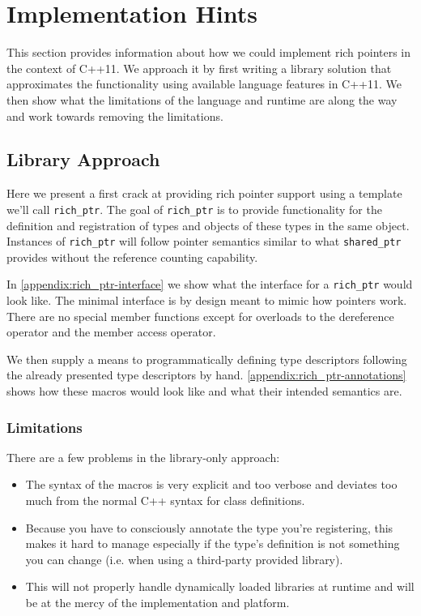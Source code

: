 \section{Implementation Hints}

This section provides information about how we could implement rich pointers
in the context of C++11. We approach it by first writing a library solution
that approximates the functionality using available language features in
C++11. We then show what the limitations of the language and runtime are along
the way and work towards removing the limitations.

\subsection{Library Approach}

Here we present a first crack at providing rich pointer support using a
template we'll call \verb+rich_ptr+. The goal of \verb+rich_ptr+ is to provide
functionality for the definition and registration of types and objects of
these types in the same object. Instances of \verb+rich_ptr+ will follow
pointer semantics similar to what \verb+shared_ptr+ provides without the
reference counting capability.

In \autoref{appendix:rich_ptr-interface} we show what the interface for a
\verb+rich_ptr+ would look like. The minimal interface is by design meant to
mimic how pointers work. There are no special member functions except for
overloads to the dereference operator and the member access operator.

We then supply a means to programmatically defining type descriptors following
the already presented type descriptors by hand.
\autoref{appendix:rich_ptr-annotations} shows how these macros would look like
and what their intended semantics are.

\subsubsection{Limitations}

There are a few problems in the library-only approach:

\begin{itemize}

 \item The syntax of the macros is very explicit and too verbose and deviates
too much from the normal C++ syntax for class definitions.

 \item Because you have to consciously annotate the type you’re registering,
this makes it hard to manage especially if the type’s definition is not
something you can change (i.e. when using a third-party provided library).

 \item This will not properly handle dynamically loaded libraries at runtime
and will be at the mercy of the implementation and platform.

\end{itemize}

